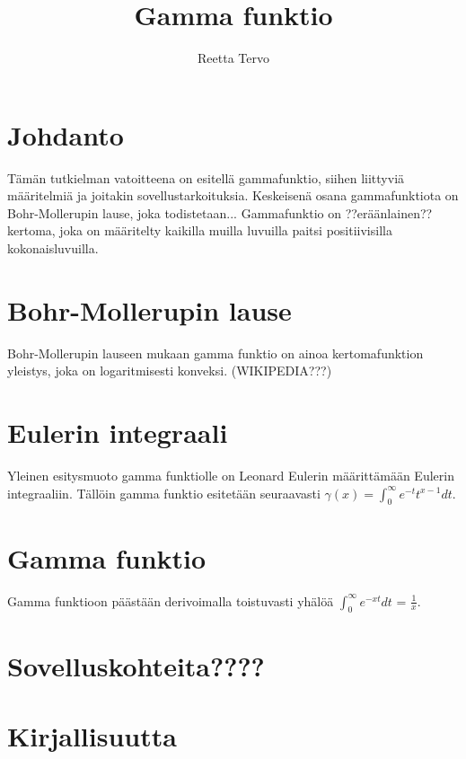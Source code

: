\documentclass[12pt]{article}
\title{Gamma funktio}
\author{Reetta Tervo}
\begin{document}
\maketitle

\newpage
\tableofcontents

\newpage
\section{Johdanto}
Tämän tutkielman vatoitteena on esitellä gammafunktio, siihen liittyviä määritelmiä ja joitakin sovellustarkoituksia. Keskeisenä osana gammafunktiota on Bohr-Mollerupin lause, joka todistetaan...
\newline
Gammafunktio on ??eräänlainen?? kertoma, joka on määritelty kaikilla muilla luvuilla paitsi positiivisilla kokonaisluvuilla. 
\newpage
\section{Bohr-Mollerupin lause}
Bohr-Mollerupin lauseen mukaan gamma funktio on ainoa kertomafunktion yleistys, joka on logaritmisesti konveksi. (WIKIPEDIA???)


\newpage
\section{Eulerin integraali}
Yleinen esitysmuoto gamma funktiolle on Leonard Eulerin määrittämään Eulerin integraaliin. Tällöin gamma funktio esitetään seuraavasti \newline
$\gamma(x) = \int_{0}^{\infty} e^{-t} t^{x-1} dt$.
\newpage
\section{Gamma funktio}\label{luk: gammafunktio}
Gamma funktioon päästään derivoimalla toistuvasti yhälöä
\newline $\int_{0}^{\infty} e^{-xt} dt$ = $\frac{1}{x}$.
\newpage
\section{Sovelluskohteita????}
\newpage
\section{Kirjallisuutta}
\end{document}
